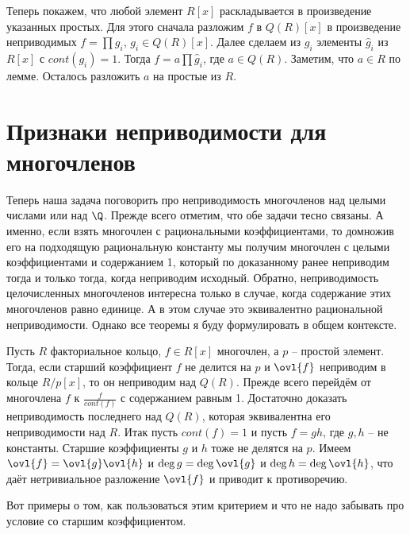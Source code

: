 Теперь покажем, что любой элемент $R[x]$ раскладывается в произведение указанных простых. Для этого сначала разложим $f$ в $Q(R)[x]$ в произведение неприводимых $f=\prod g_i$, $g_i \in Q(R)[x]$. Далее сделаем из $g_i$ элементы $\hat{g}_i$ из $R[x]$ с $cont(g_i)=1$. Тогда $f=a\prod \hat{g}_i$, где $a\in Q(R)$. Заметим, что $a\in R$ по лемме. Осталось разложить $a$ на простые из $R$.
\endproof
\ethrm








\section{Признаки неприводимости для многочленов}

Теперь наша задача поговорить про неприводимость многочленов над целыми числами или над $\Q$. 
Прежде всего отметим, что обе задачи тесно связаны. А именно, если взять многочлен с рациональными коэффициентами, то домножив его на подходящую рациональную константу мы получим многочлен с целыми коэффициентами и содержанием 1, который по доказанному ранее неприводим тогда и только тогда, когда неприводим исходный. Обратно, неприводимость целочисленных многочленов интересна только в случае, когда содержание этих многочленов равно единице. А в этом случае это эквивалентно рациональной неприводимости. Однако все теоремы я буду формулировать в общем контексте.



 Пусть $R$ факториальное кольцо, $f \in  R[x]$ многочлен, а $p$ -- простой элемент. Тогда, если старший коэффициент $f$ не делится на $p$ и $\ovl{f}$ неприводим в кольце $R/p[x]$, то он неприводим над $Q(R)$. 
\proof Прежде всего перейдём от многочлена $f$ к $\frac{f}{cont(f)}$ с содержанием равным 1. Достаточно доказать неприводимость  последнего над $Q(R)$, которая эквивалентна его неприводимости над $R$. Итак пусть $cont(f)=1$ и пусть $f=gh$, где $g,h$ --  не константы. Старшие коэффициенты $g$ и $h$ тоже не делятся на $p$. Имеем $\ovl{f}= \ovl{g}\ovl{h}$ и $\deg g = \deg \ovl{g}$ и $\deg h = \deg \ovl{h}$, что даёт нетривиальное разложение $\ovl{f}$ и приводит к противоречию.
\endproof
\ethrm

Вот примеры о том, как пользоваться этим критерием и что не надо забывать про условие со старшим коэффициентом. 


